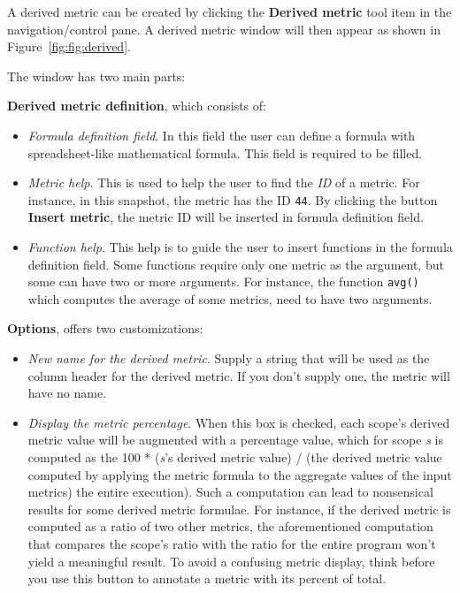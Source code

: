 A derived metric can be created by clicking the \textbf{Derived metric} tool item in the navigation/control pane.
A derived metric window will then appear as shown in Figure~\ref{fig:fig:derived}.


The window has two main parts:

\textbf{Derived metric definition}, which consists of:
\begin{itemize}

\item \textit{Formula definition field}. In this field the user can define a formula with spreadsheet-like mathematical formula. This field is required to be filled.

\item \textit{Metric help}. This is used to help the user to find the \textit{ID} of a metric. For instance, in this snapshot, the metric  has the ID \texttt{44}. By clicking the button \textbf{Insert metric}, the metric ID will be inserted in formula definition field.

\item \textit{Function help}. This help is to guide the user to insert functions in the formula definition field. Some functions require only one metric as the argument, but some can have two or more arguments. For instance, the function
\texttt{avg()} which computes the average of some metrics, need to have two arguments.
\end{itemize}

\textbf{Options}, offers two customizations:
\begin{itemize}

\item \textit{New name for the derived metric}. Supply a string that will be used as the column header for the derived metric. If you don't supply one, the metric will have no name.

\item \textit{Display the metric percentage}. When this box is checked, each scope's derived metric value will be augmented with a percentage value, which for scope \textit{s} is computed as the 100 * (\textit{s}'s derived metric value) / (the derived metric value computed by applying the metric formula to the aggregate values of the input metrics) the entire execution). Such a computation can lead to nonsensical results for some derived metric formulae. For instance, if the derived metric is computed as a ratio of two other metrics, the aforementioned computation that compares the scope's ratio with the ratio for the entire program won't yield a meaningful result. To avoid a confusing metric display, think before you use this button to annotate a metric with its percent of total.
\end{itemize}

